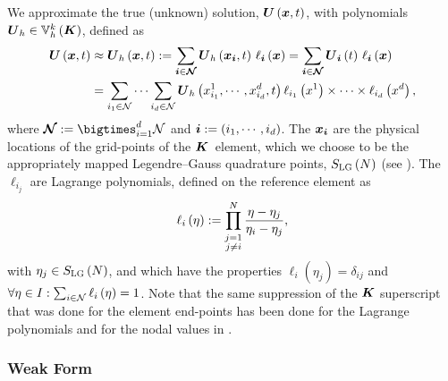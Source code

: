 We approximate the true (unknown)
solution, $\boldsymbol{U}\left(\boldsymbol{x},t\right)$,
with polynomials $\boldsymbol{U}_{h}\in\mathbb{V}^{k}_{h}\left(\boldsymbol{K}\right)$,
defined as
\begin{align}
\begin{split}
  \boldsymbol{U}\left(\boldsymbol{x},t\right)
  &\approx\boldsymbol{U}_{h}\left(\boldsymbol{x},t\right)
  :=\sum\limits_{\boldsymbol{i}\in\boldsymbol{\mathcal{N}}}
  \boldsymbol{U}_{h}\left(\boldsymbol{x}_{\boldsymbol{i}},t\right)\,\ell_{\boldsymbol{i}}\left(\boldsymbol{x}\right)
  =\sum\limits_{\boldsymbol{i}\in\boldsymbol{\mathcal{N}}}
  \boldsymbol{U}_{\boldsymbol{i}}\left(t\right)\,\ell_{\boldsymbol{i}}\left(\boldsymbol{x}\right)\\
  &=\sum\limits_{i_{1}\in\mathcal{N}}\cdots\sum\limits_{i_{d}\in\mathcal{N}}
  \boldsymbol{U}_{h}\left(x^{1}_{i_{1}},\cdots,x^{d}_{i_{d}},t\right)
  \ell_{i_{1}}\left(x^{1}\right)\times\cdots\times
  \ell_{i_{d}}\left(x^{d}\right),
  \label{eq.nodalApprox}
\end{split}
\end{align}
where $\bc{N}:=\bigtimes_{i=1}^{d}\mc{N}$
and $\boldsymbol{i}:=\left(i_{1},\cdots,i_{d}\right)$.
The $\boldsymbol{x}_{\boldsymbol{i}}$ are the physical locations of the grid-points
of the $\boldsymbol{K}$\myth\ element,
which we choose to be the appropriately mapped
Legendre--Gauss quadrature points, $S_{\textsc{LG}}\left(N\right)$
(see ).
The $\ell_{i_{j}}$ are Lagrange polynomials,
defined on the reference element as
\begin{equation}
  \ell_{i}\left(\eta\right)
  :=\prod\limits_{\stackrel{\scriptstyle j=1}{\scriptstyle j\neq i}}^{N}
  \frac{\eta-\eta_{j}}{\eta_{i}-\eta_{j}},
\end{equation}
with $\eta_{j}\in S_{\textsc{LG}}\left(N\right)$,
and which have the properties
$\ell_{i}\left(\eta_{j}\right)=\delta_{ij}$
and $\forall\eta\in I:\sum_{i\in\mathcal{N}}\ell_{i}\left(\eta\right)=1$.
Note that the same suppression of the $\boldsymbol{K}$ superscript that was done for
the element end-points has been
done for the Lagrange polynomials and for the nodal values
in .

\subsubsection{Weak Form}


